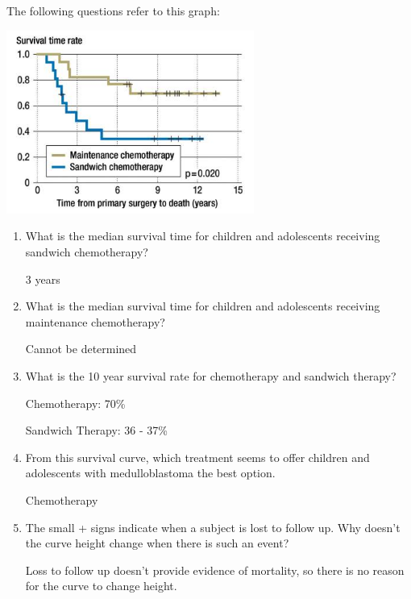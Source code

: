 

The following questions refer to this graph:

\centerline{\includegraphics[width=3.2in]{final112-survival.jpg}}

\begin{enumerate}
\item What is the median survival time for children and adolescents receiving sandwich chemotherapy?

\answerSpace{1cm}

\begin{AnswerText}
3 years
\end{AnswerText}

\item What is the median survival time for children and adolescents receiving maintenance chemotherapy?

\answerSpace{1cm}

\begin{AnswerText}
Cannot be determined
\end{AnswerText}

\item What is the 10 year survival rate for chemotherapy and sandwich therapy?

\answerSpace{1cm}

\begin{AnswerText}
Chemotherapy:  70\%

Sandwich Therapy:  36 - 37\%
\end{AnswerText}

\item From this survival curve, which treatment seems to offer children and adolescents with medulloblastoma the best option.

\answerSpace{1cm}

\begin{AnswerText}
Chemotherapy
\end{AnswerText}

\item The small + signs indicate when a subject is lost to follow up.  Why doesn't the curve height change when there is such an event?

\answerSpace{2cm}

\begin{AnswerText}
Loss to follow up doesn't provide evidence of mortality, so there is no reason for the curve to change height.
\end{AnswerText}

\end{enumerate}
